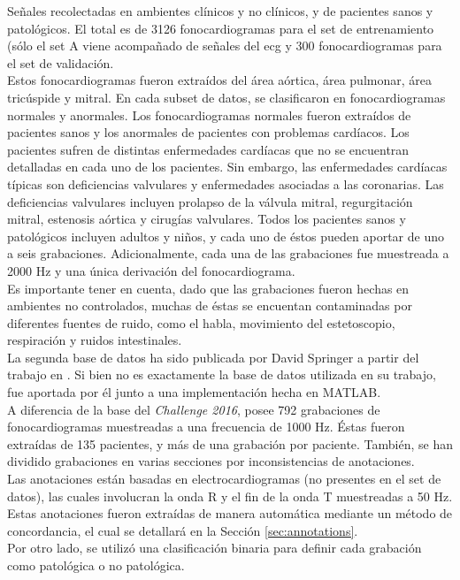\indent Señales recolectadas en ambientes clínicos y no clínicos, y de pacientes sanos y patológicos. El total es de
3126 fonocardiogramas para el set de entrenamiento (sólo el set A viene acompañado de señales del \acrshort{ecg} y
300 fonocardiogramas para el set de validación. \\
\indent Estos fonocardiogramas fueron extraídos del área aórtica, área pulmonar, área tricúspide y mitral. En cada
subset de datos, se clasificaron en fonocardiogramas normales y anormales. Los fonocardiogramas normales fueron
extraídos de pacientes sanos y los anormales de pacientes con problemas cardíacos. Los pacientes sufren de distintas
enfermedades cardíacas que no se encuentran detalladas en cada uno de los pacientes. Sin embargo, las enfermedades
cardíacas típicas son deficiencias valvulares y enfermedades asociadas a las coronarias. Las deficiencias valvulares
incluyen prolapso de la válvula mitral, regurgitación mitral, estenosis aórtica y cirugías valvulares. Todos los
pacientes sanos y patológicos incluyen adultos y niños, y cada uno de éstos pueden aportar de uno a seis grabaciones.
Adicionalmente, cada una de las grabaciones fue muestreada a 2000 Hz y una única derivación del fonocardiograma. \\
\indent Es importante tener en cuenta, dado que las grabaciones fueron hechas en ambientes no controlados, muchas
de éstas se encuentan contaminadas por diferentes fuentes de ruido, como el habla, movimiento del estetoscopio,
respiración y ruidos intestinales. \\
\indent La segunda base de datos ha sido publicada por David Springer a partir del trabajo en \cite{pp:springer2015}
. Si bien no es exactamente la base de datos utilizada en su trabajo, fue aportada por él junto a una implementación
hecha en \textsc{MATLAB\texttrademark}. \\
\indent A diferencia de la base del \textit{Challenge 2016}, posee 792 grabaciones de fonocardiogramas muestreadas a
una frecuencia de 1000 Hz. Éstas fueron extraídas de 135 pacientes, y más de una grabación por paciente. También, se
han dividido grabaciones en varias secciones por inconsistencias de anotaciones. \\
\indent Las anotaciones están basadas en electrocardiogramas (no presentes en el set de datos), las cuales
involucran la onda R y el fin de la onda T muestreadas a 50 Hz. Estas anotaciones fueron extraídas de manera
automática mediante un método de concordancia, el cual se detallará en la Sección \ref{sec:annotations}. \\
\indent Por otro lado, se utilizó una clasificación binaria para definir cada grabación como patológica o no
patológica.

